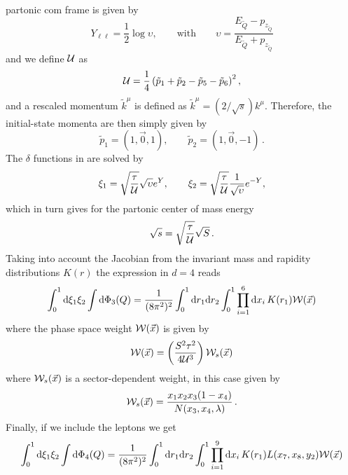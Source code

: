 \documentclass[a4paper,11pt]{article}
\begin{document}
partonic com frame is given by
\begin{equation}
Y_{\ell\ell} = \frac{1}{2}
\log\upsilon , \quad\quad \mathrm{with}\quad\quad
\upsilon  = \frac{E_{\tilde{Q}}-p_{z_{\tilde{Q}}}}{E_{\tilde{Q}}+p_{z_{\tilde{Q}}}}
\end{equation}
and we define $\mathcal{U}$ as
\begin{align}
\mathcal{U} = \frac{1}{4}
\left(\tilde{p}_{1}+\tilde{p}_{2}-\tilde{p}_{5}-\tilde{p}_{6}\right)^2,
\end{align}
and a rescaled momentum $\tilde{k}^\mu$ is defined as 
$\tilde{k}^\mu = (2/\sqrt{s})k^\mu$. 
Therefore, the initial-state momenta are then simply given by
\begin{equation}
\tilde{p}_1 = (1,\vec{0},1), \quad\quad
\tilde{p}_2 = (1,\vec{0},-1)\,.
\end{equation}
The $\delta$ functions in  are solved by
\begin{equation}
\xi_1 = \sqrt{\frac{\tau}{\mathcal{U}}} \sqrt{\upsilon} e^{Y}, \quad\quad
\xi_2 = \sqrt{\frac{\tau}{\mathcal{U}}} \frac{1}{\sqrt{\upsilon}} e^{-Y},
\end{equation}
which in turn gives for the partonic center of mass energy
\begin{equation}
\sqrt{s} = \sqrt{\frac{\tau}{\mathcal{U}}} \sqrt{S}\, .
\end{equation}
Taking into account the Jacobian from the invariant mass and rapidity 
distributions $K(r)$ the expression in $d=4$ reads
\begin{equation}
\int^1_0 \mathrm d \xi_1 \xi_2 \int \mathrm d \Phi_3 (Q) = 
\frac{1}{(8\pi^2)^2}
\int^{1}_{0} \mathrm d r_1 \mathrm d r_2
\int^1_0\prod_{i=1}^6 \mathrm d x_i\,
K(r_1) \mathcal{W}(\vec{x})
\end{equation}
where the phase space weight $\mathcal{W}(\vec{x})$ is given by
\begin{equation}
\mathcal{W}(\vec{x}) = \left(\frac{S^2 \tau^2}{4\mathcal{U}^3}\right)
\mathcal{W}_s(\vec{x})
\end{equation}
where $\mathcal{W}_s(\vec{x})$ is a sector-dependent weight, in this case
given by
\begin{equation}
\mathcal{W}_s(\vec{x}) = \frac{x_1 x_2 x_3 (1-x_4)}{N(x_3,x_4,\lambda)}\,.
\end{equation}
Finally, if we include the leptons we get
\begin{equation}
\int^1_0 \mathrm d \xi_1 \xi_2 \int \mathrm d \Phi_4 (Q) = 
\frac{1}{(8\pi^2)^2}
\int^{1}_{0} \mathrm d r_1 \mathrm d r_2
\int^1_0\prod_{i=1}^9 \mathrm d x_i\,
K(r_1) L(x_7,x_8,y_2)\mathcal{W}(\vec{x})
\end{equation}
\end{document}

